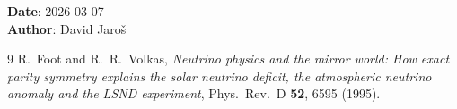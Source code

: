 \documentclass[12pt]{article}
\theoremstyle{definition}
\theoremstyle{remark}
\begin{document}
\noindent\textbf{Date}: 2026-03-07 \\
\textbf{Author}: David Jaroš

\begin{thebibliography}{9}
R.\ Foot and R.\ R.\ Volkas, \textit{Neutrino physics and the mirror world:
How exact parity symmetry explains the solar neutrino deficit, the atmospheric
neutrino anomaly and the LSND experiment},
Phys.\ Rev.\ D \textbf{52}, 6595 (1995).
\end{thebibliography}

\ifdefined\INCLUDEMODE
\else
\end{document}
